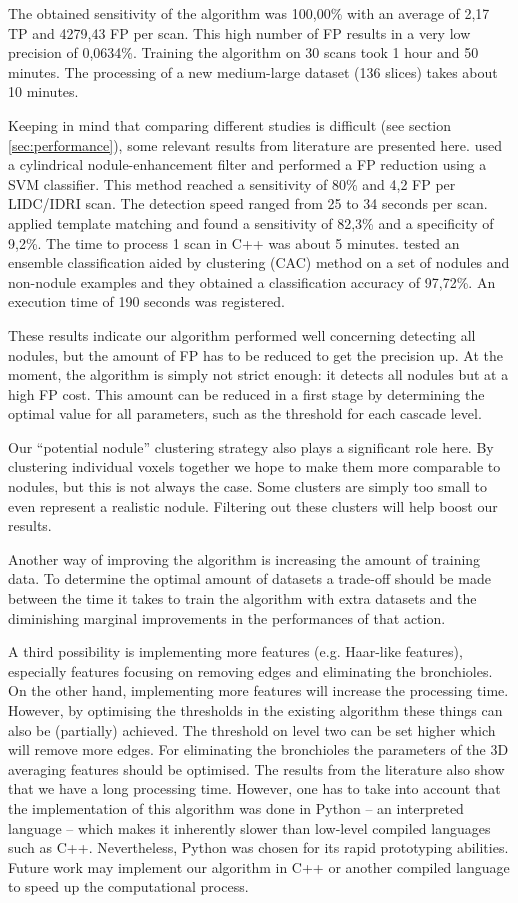 The obtained sensitivity of the algorithm was 100,00\% with an average of 2,17
TP and 4279,43 FP per scan. This high number of FP results in a very low
precision of 0,0634\%. Training the algorithm on 30 scans took 1 hour and 50
minutes. The processing of a new medium-large dataset (136 slices) takes about
10 minutes.

Keeping in mind that comparing different studies is difficult (see section
\ref{sec:performance}), some relevant results from literature are presented
here. \cite{teramoto} used a cylindrical nodule-enhancement filter and performed
a FP reduction using a SVM classifier. This method reached a sensitivity of 80\%
and 4,2 FP per LIDC/IDRI scan. The detection speed ranged from 25 to 34 seconds
per scan. \cite{elbaz} applied template matching and found a sensitivity of
82,3\% and a specificity of 9,2\%. The time to process 1 scan in C++ was about 5
minutes. \cite{lee2010} tested an ensemble classification aided by clustering
(CAC) method on a set of nodules and non-nodule examples and they obtained a
classification accuracy of 97,72\%. An execution time of 190 seconds was
registered.

These results indicate our algorithm performed well concerning detecting all
nodules, but the amount of FP has to be reduced to get the precision up. At the
moment, the algorithm is simply not strict enough: it detects all nodules but at
a high FP cost. This amount can be reduced in a first stage by determining
the optimal value for all parameters, such as the threshold for each cascade
level.

Our ``potential nodule'' clustering strategy also plays a significant role here.
By clustering individual voxels together we hope to make them more comparable
to nodules, but this is not always the case. Some clusters are simply too small
to even represent a realistic nodule. Filtering out these clusters will help
boost our results.

Another way of improving the algorithm is increasing the amount of training
data. To determine the optimal amount of datasets a trade-off should be made
between the time it takes to train the algorithm with extra datasets and the
diminishing marginal improvements in the performances of that action. 

A third possibility is implementing more features (e.g. Haar-like features),
especially features focusing on removing edges and eliminating the bronchioles.
On the other hand, implementing more features will increase the processing time.
However, by optimising the thresholds in the existing algorithm these things can
also be (partially) achieved. The threshold on level two can be set higher which
will remove more edges. For eliminating the bronchioles the parameters of the 3D
averaging features should be optimised. The results from the literature also
show that we have a long processing time. However, one has to take into account
that the implementation of this algorithm was done in Python -- an interpreted
language -- which makes it inherently slower than low-level compiled languages
such as C++. Nevertheless, Python was chosen for its rapid prototyping
abilities. Future work may implement our algorithm in C++ or another compiled
language to speed up the computational process.

